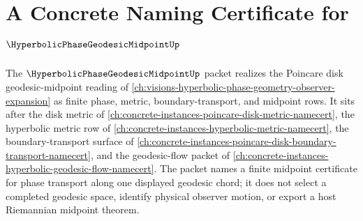 \chapter{A Concrete Naming Certificate for $\HyperbolicPhaseGeodesicMidpointUp$}
\label{ch:concrete-instances-hyperbolic-phase-geodesic-midpoint-namecert}

The $\HyperbolicPhaseGeodesicMidpointUp$ packet realizes the Poincare disk geodesic-midpoint reading of \autoref{ch:visions-hyperbolic-phase-geometry-observer-expansion} as finite phase, metric, boundary-transport, and midpoint rows. It sits after the disk metric of \autoref{ch:concrete-instances-poincare-disk-metric-namecert}, the hyperbolic metric row of \autoref{ch:concrete-instances-hyperbolic-metric-namecert}, the boundary-transport surface of \autoref{ch:concrete-instances-poincare-disk-boundary-transport-namecert}, and the geodesic-flow packet of \autoref{ch:concrete-instances-hyperbolic-geodesic-flow-namecert}. The packet names a finite midpoint certificate for phase transport along one displayed geodesic chord; it does not select a completed geodesic space, identify physical observer motion, or export a host Riemannian midpoint theorem.

